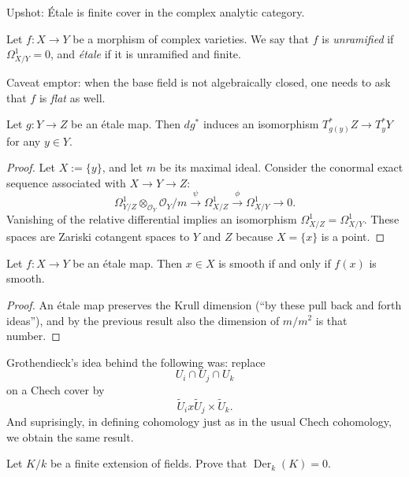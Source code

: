 \noindent
Upshot: Étale is finite cover in
the complex analytic category.

\begin{definition}
\label{definition-etale-map}
Let $f:X \to Y$ be a morphism of complex
varieties. We say that $f$ is {\it unramified}
if $\Omega^1_{X/Y}=0$, and {\it \'etale} if
it is unramified and finite.
\end{definition}

\begin{remark}
\label{remark-etale-map-flat}
Caveat emptor: when the base field is not
algebraically closed, one needs to ask that
$f$ is {\it flat} as well.
\end{remark}

\begin{theorem}
\label{theorem-etale-cotangent-isomorphism}
Let $g:Y \to Z$ be an \'etale map. Then
$dg^\ast$ induces an isomorphism
$T^\ast_{g(y)}Z \to T^\ast_yY$ for any
$y\in Y$.
\end{theorem}

\begin{proof}
Let $X:=\{y\}$, and let $m$ be its maximal
ideal. Consider the conormal exact sequence
associated with
$X \to Y \to Z$:
$$
\Omega^1_{Y/Z}\otimes_{\mathcal O_Y}
\mathcal O_Y/m
\xrightarrow{\psi}
\Omega^1_{X/Z}
\xrightarrow{\phi}
\Omega^1_{X/Y}\to 0.
$$
Vanishing of the relative differential
implies an isomorphism
$\Omega^1_{X/Z}=\Omega^1_{X/Y}$.
These spaces are Zariski cotangent spaces to
$Y$ and $Z$ because $X=\{x\}$ is a point.
\end{proof}

\begin{corollary}
\label{lemma-etale-smooth-points}
Let $f:X \to Y$ be an \'etale map. Then
$x\in X$ is smooth if and only if $f(x)$ is
smooth.
\end{corollary}

\begin{proof}
An \'etale map preserves the Krull dimension
(``by these pull back and forth ideas''),
and by the previous result also the 
dimension of $m/m^2$ is that number.
\end{proof}

\noindent
Grothendieck's idea behind the following was:
replace
$$
U_i\cap U_j \cap U_k
$$
on a Chech cover by
$$
\tilde{U}_i x \tilde{U}_j \times \tilde{U}_k.
$$
And suprisingly, in defining cohomology
just as in the usual Chech cohomology,
we obtain the same result.


\begin{exercise}
\label{exercise-derivations-finite-field-extension}
Let $K/k$ be a finite extension of fields.
Prove that $\operatorname{Der}_k(K)=0$.
\end{exercise}

